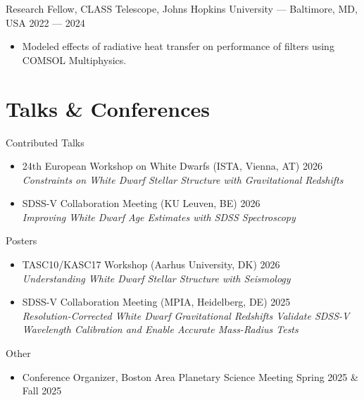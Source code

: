 \documentclass[11pt]{article}       %
\begin{document}
Research Fellow, {CLASS Telescope, Johns Hopkins University} --- Baltimore, MD, USA \hfill  2022 --- 2024 \\
\vspace{-9pt}
\begin{itemize}
  \item Modeled effects of radiative heat transfer on performance of filters using COMSOL Multiphysics.
\end{itemize}


\vspace{-16.5pt}

\section{Talks \& Conferences}
Contributed Talks
\begin{itemize}
  \item 24th European Workshop on White Dwarfs (ISTA, Vienna, AT) \hfill 2026 \\
      \vspace{4pt} \textit{Constraints on White Dwarf Stellar Structure with Gravitational Redshifts}
  \item SDSS-V Collaboration Meeting (KU Leuven, BE) \hfill 2026 \\
      \vspace{4pt} \textit{Improving White Dwarf Age Estimates with SDSS Spectroscopy}
\end{itemize}

Posters
\begin{itemize}
  \item TASC10/KASC17 Workshop (Aarhus University, DK) \hfill 2026 \\
  \vspace{4pt} \textit{Understanding White Dwarf Stellar Structure with Seismology}
  \item SDSS-V Collaboration Meeting (MPIA, Heidelberg, DE) \hfill 2025 \\
  \vspace{4pt} \textit{Resolution-Corrected White Dwarf Gravitational Redshifts Validate SDSS-V Wavelength Calibration and Enable Accurate Mass-Radius Tests}
\end{itemize}

Other
\begin{itemize}
  \item Conference Organizer, Boston Area Planetary Science Meeting \hfill Spring 2025 \& Fall 2025
\end{itemize}
\end{document}
